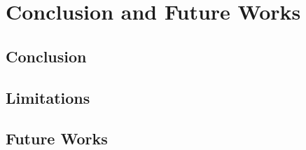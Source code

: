 \chapter{Conclusion and Future Works}
\label{ch:Conclusion and Future Works}
\section{Conclusion}
\section{Limitations}
\section{Future Works}

